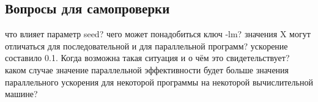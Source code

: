 \subsection{Вопросы для самопроверки}
\begin{enumerate}
     что влияет параметр seed?
     чего может понадобиться ключ -lm?
     значения X могут отличаться для последовательной и для параллельной программ?
     ускорение составило 0.1. Когда возможна такая ситуация и о чём это свидетельствует?
     каком случае значение параллельной эффективности будет больше значения параллельного ускорения для некоторой программы на некоторой вычислительной машине?
\end{enumerate}
